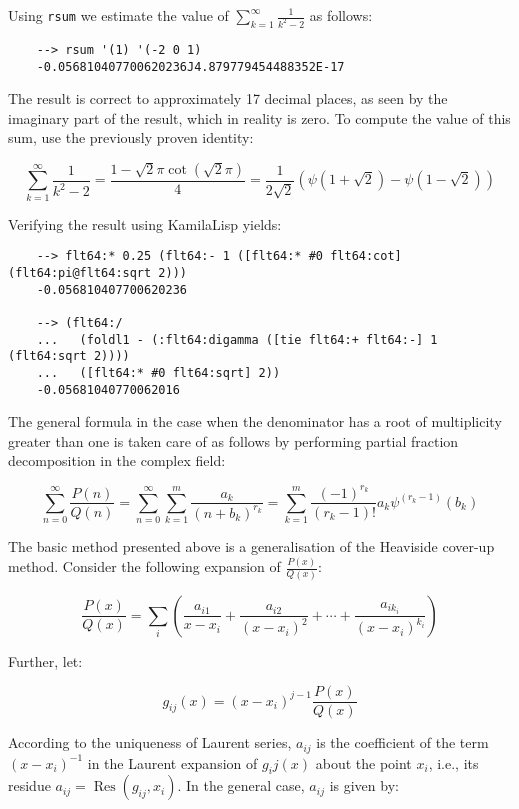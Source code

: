 Using \verb|rsum| we estimate the value of $\displaystyle \sum_{k=1}^{\infty} \frac{1}{k^2-2}$ as follows:

\begin{Verbatim}
    --> rsum '(1) '(-2 0 1)
    -0.056810407700620236J4.879779454488352E-17
\end{Verbatim}

The result is correct to approximately 17 decimal places, as seen by the imaginary part of the result, which in reality is zero. To compute the value of this sum, use the previously proven identity:

$$\sum_{k=1}^\infty \frac{1}{k^2 - 2} = \frac{1-\sqrt{2}\pi\cot(\sqrt{2}\pi)}{4} = \frac{1}{2\sqrt{2}}\left(\psi\left(1+\sqrt{2}\right)-\psi\left(1-\sqrt{2}\right)\right)$$

Verifying the result using KamilaLisp yields:

\begin{Verbatim}
    --> flt64:* 0.25 (flt64:- 1 ([flt64:* #0 flt64:cot] (flt64:pi@flt64:sqrt 2)))
    -0.056810407700620236

    --> (flt64:/
    ...   (foldl1 - (:flt64:digamma ([tie flt64:+ flt64:-] 1 (flt64:sqrt 2))))
    ...   ([flt64:* #0 flt64:sqrt] 2))
    -0.05681040770062016
\end{Verbatim}

The general formula in the case when the denominator has a root of multiplicity greater than one is taken care of as follows by performing partial fraction decomposition in the complex field:

$$
\sum_{n=0}^{\infty }\frac{P(n)}{Q(n)}=\sum _{n=0}^{\infty }\sum
_{k=1}^{m}{\frac {a_{k}}{(n+b_{k})^{r_{k}}}}=\sum _{k=1}^{m}{\frac
{(-1)^{r_{k}}}{(r_{k}-1)!}}a_{k}\psi ^{(r_{k}-1)}(b_{k})
$$

The basic method presented above is a generalisation of the Heaviside cover-up method. Consider the following expansion of $\frac{P(x)}{Q(x)}$:

$$
\frac{P(x)}{Q(x)}=\sum _{i}\left({\frac {a_{i1}}{x-x_{i}}}+{\frac {a_{i2}}{(x-x_{i})^{2}}}+\cdots +{\frac {a_{ik_{i}}}{(x-x_{i})^{k_{i}}}}\right)
$$

Further, let:

$$
g_{ij}(x)=(x-x_{i})^{j-1}\frac{P(x)}{Q(x)}
$$

According to the uniqueness of Laurent series, $a_{ij}$ is the coefficient of the term $(x − x_i)^{−1}$ in the Laurent expansion of $g_ij(x)$ about the point $x_i$, i.e., its residue ${\displaystyle a_{ij}=\operatorname {Res} (g_{ij},x_{i})}$. In the general case, $a_{ij}$ is given by:

